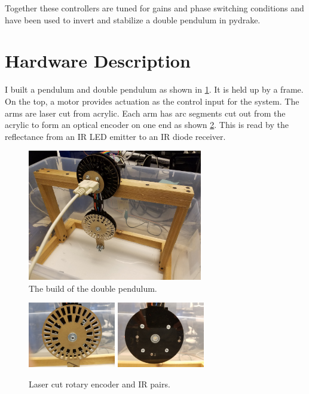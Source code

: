 \documentclass[conference]{IEEEtran}
\begin{document}
Together these controllers are tuned for gains and phase switching conditions and have been used to invert and stabilize a double pendulum in pydrake.

\section{Hardware Description}

I built a pendulum and double pendulum as shown in \cref{fig:build}. It is held up by a frame. On the top, a motor provides actuation as the control input for the system. The arms are laser cut from acrylic. Each arm has arc segments cut out from the acrylic to form an optical encoder on one end as shown \cref{fig:rotary}. This is read by the reflectance from an IR LED emitter to an IR diode receiver.

\begin{figure}[ht]
	\centering
	\includegraphics[width=3in]{build.jpg}
	\caption{The build of the double pendulum.}
	\label{fig:build}
\end{figure}

\begin{figure}[ht]
	\centering
	\includegraphics[width=1.5in]{rotary.jpg}
	\includegraphics[width=1.5in]{led.jpg}
	\caption{Laser cut rotary encoder and IR pairs.}
	\label{fig:rotary}
\end{figure}
\end{document}
